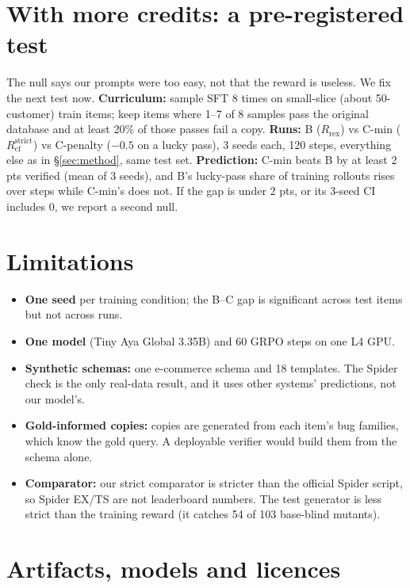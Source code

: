\documentclass{article}
\newcommand{\Rrex}{R_{\mathrm{rex}}}
\newcommand{\Rcf}{R_{\mathrm{cf}}}
\begin{document}
\section{With more credits: a pre-registered test}
\label{sec:prereg}

The null says our prompts were too easy, not that the reward is useless. We fix the next test now.
\textbf{Curriculum:} sample SFT 8 times on small-slice (about 50-customer) train items; keep items where 1--7 of 8 samples pass the original database and at least 20\% of those passes fail a copy.
\textbf{Runs:} B ($\Rrex$) vs C-min ($\Rcf^{\mathrm{strict}}$) vs C-penalty ($-0.5$ on a lucky pass), 3 seeds each, 120 steps, everything else as in \S\ref{sec:method}, same test set.
\textbf{Prediction:} C-min beats B by at least 2 pts verified (mean of 3 seeds), and B's lucky-pass share of training rollouts rises over steps while C-min's does not. If the gap is under 2 pts, or its 3-seed CI includes 0, we report a second null.

\section{Limitations}
\label{sec:limits}

\begin{itemize}
  \item \textbf{One seed} per training condition; the B--C gap is significant across test items but not across runs.
  \item \textbf{One model} (Tiny Aya Global 3.35B) and 60 GRPO steps on one L4 GPU.
  \item \textbf{Synthetic schemas:} one e-commerce schema and 18 templates. The Spider check is the only real-data result, and it uses other systems' predictions, not our model's.
  \item \textbf{Gold-informed copies:} copies are generated from each item's bug families, which know the gold query. A deployable verifier would build them from the schema alone.
  \item \textbf{Comparator:} our strict comparator is stricter than the official Spider script, so Spider EX/TS are not leaderboard numbers. The test generator is less strict than the training reward (it catches 54 of 103 base-blind mutants).
\end{itemize}

\section*{Artifacts, models and licences}
\end{document}
